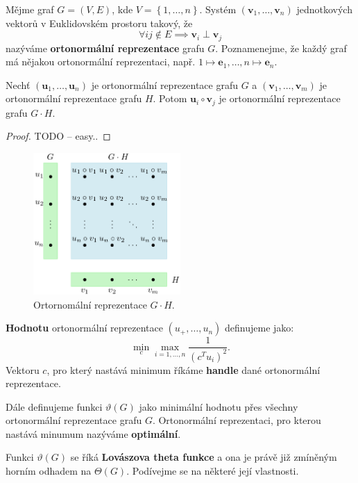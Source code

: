 Mějme graf $G = (V,E)$, kde $V = \left\{ 1, \dots, n \right\}$. Systém $\left( \textbf{v}_1, \dots, \textbf{v}_n \right)$ jednotkových vektorů v Euklidovském prostoru takový, že
$$
    \forall ij \notin E \implies \textbf{v}_i \perp \textbf{v}_j
$$
nazýváme \textbf{ortonormální reprezentace} grafu $G$. Poznamenejme, že každý graf má nějakou ortonormální reprezentaci, např. $1 \mapsto \mathbf{e}_1, \dots, n \mapsto \mathbf{e}_n$.

\begin{lm}
    Nechť $\left( \mathbf{u}_1, \dots, \mathbf{u}_n \right)$ je ortonormální reprezentace grafu $G$ a $\left( \mathbf{v}_1, \dots, \mathbf{v}_m \right)$ je ortonormální reprezentace grafu $H$. Potom $\mathbf{u}_i \circ \mathbf{v}_j$ je ortonormální reprezentace grafu $G \cdot H$.
\end{lm}

\begin{proof}
    TODO -- easy..
\end{proof}

\begin{figure}[h!]
    \centering
    \includegraphics[width=0.5\textwidth]{img/shannon_lemma.png}   
    \caption{Ortornomální reprezentace $G \cdot H$.}
    \label{fig:orthonormal_repr_GH}
\end{figure}

\textbf{Hodnotu} ortonormální reprezentace $\left(u_+, \dots, u_n \right)$ definujeme jako:
$$
    \min_c \max_{i = 1, \dots, n} \frac{1}{\left( c^T u_i \right)^2}.
$$
Vektoru $c$, pro který nastává minimum říkáme \textbf{handle} dané ortonormální reprezentace.

Dále definujeme funkci $\vartheta(G)$ jako minimální hodnotu přes všechny ortonormální reprezentace grafu $G$. Ortonormální reprezentaci, pro kterou nastává minumum nazýváme \textbf{optimální}.

Funkci $\vartheta(G)$ se říká \textbf{Lovászova theta funkce} a ona je právě již zmíněným horním odhadem na $\Theta(G)$. Podívejme se na některé její vlastnosti.

